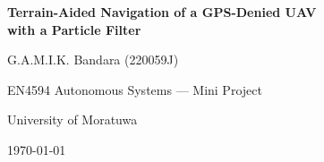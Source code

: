 \documentclass[11pt,a4paper]{article}
\begin{document}
\begin{titlepage}
  \centering
  \vspace*{30mm}
  {\LARGE\bfseries Terrain-Aided Navigation of a GPS-Denied UAV\\ with a Particle Filter\par}
  \vspace{15mm}
  {\large G.A.M.I.K. Bandara (220059J)\par}
  \vspace{5mm}
  {\large EN4594 Autonomous Systems --- Mini Project\par}
  \vspace{5mm}
  {\large University of Moratuwa\par}
  \vfill
  {\large \today\par}
\end{titlepage}

\begin{abstract}

\end{abstract}

\tableofcontents
\newpage











\appendix

\end{document}
